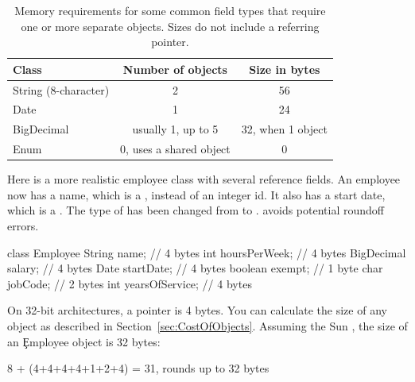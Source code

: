\begin{table}[htbp]
  \centering
\begin{tabular}{lcc} \toprule
	Class & Number of objects & Size in bytes \\ \midrule
	String (8-character) & 2 & 56 \\
	Date & 1 & 24 \\
	BigDecimal & usually 1, up to 5 & 32, when 1 object \\
	Enum & 0, uses a shared object & 0 \\
	\bottomrule
\end{tabular}
  \caption{Memory requirements for some common field types that require one
  or more separate objects. Sizes do not include a referring pointer.
  }
  \label{tab:common-delegated-field-types}
\end{table}

Here is a more realistic employee class with several reference fields. An
employee now has a name, which is a , instead of an integer id. It
also has a start date, which is a . The type of  has
been changed from  to .  avoids potential roundoff errors.
\begin{shortlisting} 
class Employee {
    String name;                // 4 bytes
    int hoursPerWeek;           // 4 bytes
    BigDecimal salary;          // 4 bytes
    Date startDate;             // 4 bytes
    boolean exempt;             // 1 byte
    char jobCode;               // 2 bytes
    int yearsOfService;         // 4 bytes
}
\end{shortlisting}

On 32-bit architectures, a pointer is 4 bytes. 
You can calculate the size of any object as described in
Section~\ref{sec:CostOfObjects}.
Assuming the Sun \jre, the size of an \c{Employee} object is 32 bytes:
\begin{shortlisting}
8 + (4+4+4+4+1+2+4) = 31, rounds up to 32 bytes
\end{shortlisting}

